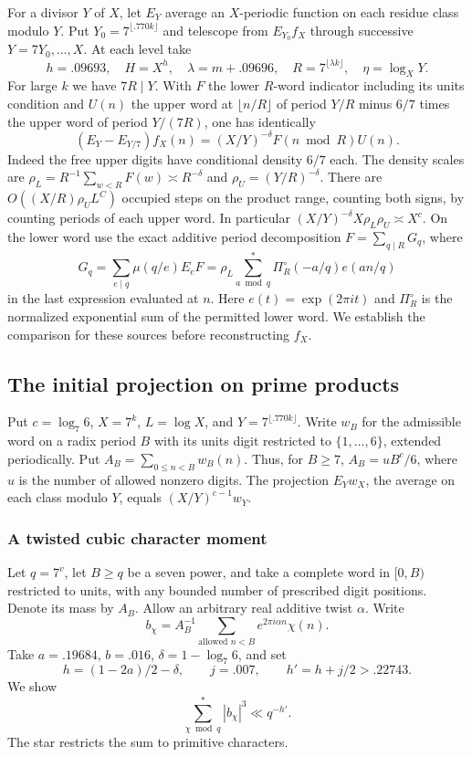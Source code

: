 \documentclass[11pt,a4paper]{article}
\theoremstyle{paperplain}
\numberwithin{equation}{section}
\begin{document}
For a divisor $Y$ of $X$, let $E_Y$ average an $X$-periodic
function on each residue class modulo $Y$. Put
$Y_0=7^{\lfloor .770k\rfloor}$ and telescope from $E_{Y_0}f_X$
through successive $Y=7Y_0,\ldots,X$. At each level take
\[
 h=.09693,\quad H=X^h,\quad \lambda=m+.09696,\quad
 R=7^{\lfloor\lambda k\rfloor},\quad \eta=\log_XY .
\]
For large $k$ we have $7R\mid Y$. With $F$ the lower $R$-word
indicator including its units condition and $U(n)$ the upper
word at $\lfloor n/R\rfloor$ of period $Y/R$ minus $6/7$ times the
upper word of period $Y/(7R)$, one has identically
\[
 (E_Y-E_{Y/7}) f_X(n)=(X/Y)^{-\delta}F(n\bmod R)U(n).
\]
Indeed the free upper digits have conditional density $6/7$ each.
The density scales are $\rho_L=R^{-1}\sum_{w<R}F(w)\asymp
R^{-\delta}$ and $\rho_U=(Y/R)^{-\delta}$. There are
$O((X/R)\rho_U L^C)$ occupied steps on the product range, counting
both signs, by counting periods of each upper word. In particular
$(X/Y)^{-\delta}X\rho_L\rho_U\asymp X^c$.
On the lower word use the exact additive period decomposition
$F=\sum_{q\mid R}G_q$, where
\[
 G_q=\sum_{e\mid q}\mu(q/e)E_e F
 =\rho_L\!\sum_{a\bmod q}^{*}\Pi_R^{\circ}(-a/q)e(an/q)
\]
in the last expression evaluated at $n$. Here $e(t)=\exp(2\pi i t)$
and $\Pi_R^{\circ}$ is the normalized exponential sum of the
permitted lower word. We establish the comparison for these sources
before reconstructing $f_X$.


\subsection{The initial projection on prime products}
\label{b7:initial-section}

Put \(c=\log_7 6\), \(X=7^k\), \(L=\log X\), and
\(Y=7^{\lfloor .770k\rfloor}\). Write \(w_B\) for the admissible
word on a radix period \(B\) with its units digit restricted to
\(\{1,\ldots,6\}\), extended periodically. Put
\(A_B=\sum_{0\le n<B}w_B(n)\). Thus, for \(B\ge7\),
\(A_B=uB^c/6\), where \(u\) is the number of allowed nonzero digits.
The projection \(E_Y w_X\), the average on each class modulo \(Y\),
equals \((X/Y)^{c-1}w_Y\).

\subsubsection{A twisted cubic character moment}
\label{b7:refined-cube-section}

Let \(q=7^v\), let \(B\ge q\) be a seven power, and take a complete word
in \([0,B)\) restricted to units, with any bounded number of prescribed
digit positions. Denote its mass by \(A_B\). Allow an arbitrary real
additive twist \(\alpha\). Write
\[
 b_\chi=A_B^{-1}\sum_{\text{allowed }n<B}
             e^{2\pi i\alpha n}\chi(n).
\]
Take \(a=.19684\), \(b=.016\), \(\delta=1-\log_7 6\), and set
\[
 h=(1-2a)/2-\delta,\qquad j=.007,\qquad h'=h+j/2>.22743.
\]
We show
\begin{equation}\label{b7:refined-cube}
 \sum_{\chi\bmod q}^{*}|b_\chi|^3\ll q^{-h'}.
\end{equation}
The star restricts the sum to primitive characters.
\end{document}
